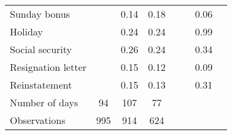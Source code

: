 \begin{tabular}{lccccccc}
Sunday bonus &       & 0.14  & 0.18  &       &       & \multicolumn{1}{r}{\cellcolor[rgb]{ .816,  .808,  .808} 0.06} &  \\
Holiday &       & 0.24  & 0.24  &       &       & \multicolumn{1}{r}{0.99} &  \\
Social security &       & 0.26  & 0.24  &       &       & \multicolumn{1}{r}{0.34} &  \\
Resignation letter &       & 0.15  & 0.12  &       &       & \multicolumn{1}{r}{\cellcolor[rgb]{ .816,  .808,  .808} 0.09} &  \\
Reinstatement &       & 0.15  & 0.13  &       &       & \multicolumn{1}{r}{0.31} &  \\
Number of days & 94    & 107   & 77    &       &       &       &  \\
\midrule
Observations & 995   & 914   & 624   &       &       &       &  \\
\bottomrule
\bottomrule
\end{tabular}%
